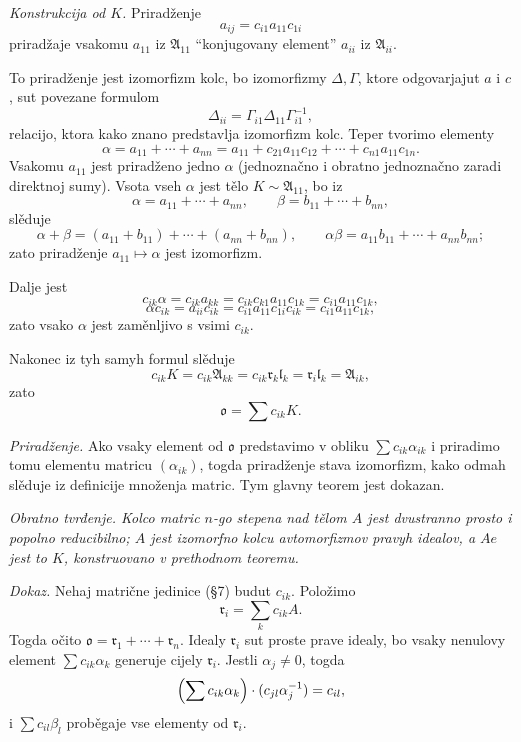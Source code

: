 \documentclass[11pt]{article}
\providecommand{\mA}{\mathfrak{A}}
\providecommand{\ml}{\mathfrak{l}}
\providecommand{\mo}{\mathfrak{o}}
\providecommand{\mr}{\mathfrak{r}}
\begin{document}

\emph{Konstrukcija od $K$.} Priradženje
\[
        a_{ij}=c_{i1}a_{11}c_{1i}
\]
priradžaje vsakomu $a_{11}$ iz $\mA_{11}$ ``konjugovany element'' $a_{ii}$ iz $\mA_{ii}$.

To priradženje jest izomorfizm kolc, bo izomorfizmy $\Delta,\Gamma$, ktore odgovarjajut $a$ i $c$, sut povezane formulom
\[
        \Delta_{ii}=\Gamma_{i1}\Delta_{11}\Gamma_{i1}^{-1},
\]
relacijo, ktora kako znano predstavlja izomorfizm kolc. Teper tvorimo elementy
\[
        \alpha=a_{11}+\cdots+a_{nn}=a_{11}+c_{21}a_{11}c_{12}+\cdots+c_{n1}a_{11}c_{1n}.
\]
Vsakomu $a_{11}$ jest priradženo jedno $\alpha$ (jednoznačno i obratno jednoznačno zaradi direktnoj sumy). Vsota vseh $\alpha$ jest tělo $K\sim\mA_{11}$, bo iz
\[
        \alpha=a_{11}+\cdots+a_{nn},
        \qquad
        \beta=b_{11}+\cdots+b_{nn},
\]
slěduje
\[
        \alpha+\beta=(a_{11}+b_{11})+\cdots+(a_{nn}+b_{nn}),
        \qquad
        \alpha\beta=a_{11}b_{11}+\cdots+a_{nn}b_{nn};
\]
zato priradženje $a_{11}\mapsto\alpha$ jest izomorfizm.

Dalje jest
\[
        c_{ik}\alpha=c_{ik}a_{kk}=c_{ik}c_{k1}a_{11}c_{1k}=c_{i1}a_{11}c_{1k},
\]
\[
        \alpha c_{ik}=a_{ii}c_{ik}=c_{i1}a_{11}c_{1i}c_{ik}=c_{i1}a_{11}c_{1k},
\]
zato vsako $\alpha$ jest zaměnljivo s vsimi $c_{ik}$.

Nakonec iz tyh samyh formul slěduje
\[
        c_{ik}K=c_{ik}\mA_{kk}=c_{ik}\mr_k\ml_k=\mr_i\ml_k=\mA_{ik},
\]
zato
\[
        \mo=\sum c_{ik}K.
\]

\emph{Priradženje.} Ako vsaky element od $\mo$ predstavimo v obliku $\sum c_{ik}\alpha_{ik}$ i priradimo tomu elementu matricu $(\alpha_{ik})$, togda priradženje stava izomorfizm, kako odmah slěduje iz definicije množenja matric. Tym glavny teorem jest dokazan.

\emph{Obratno tvrđenje. Kolco matric $n$-go stepena nad tělom $A$ jest dvustranno prosto i popolno reducibilno; $A$ jest izomorfno kolcu avtomorfizmov pravyh idealov, a $Ae$ jest to $K$, konstruovano v prethodnom teoremu.}

\emph{Dokaz.} Nehaj matrične jedinice (§7) budut $c_{ik}$. Položimo
\[
        \mr_i=\sum_k c_{ik}A.
\]
Togda očito $\mo=\mr_1+\cdots+\mr_n$. Idealy $\mr_i$ sut proste prave idealy, bo vsaky nenulovy element $\sum c_{ik}\alpha_k$ generuje cijely $\mr_i$. Jestli $\alpha_j\ne0$, togda
\[
        \Bigl(\sum c_{ik}\alpha_k\Bigr)\cdot(c_{jl}\alpha_j^{-1})=c_{il},
\]
i $\sum c_{il}\beta_l$ proběgaje vse elementy od $\mr_i$.
\end{document}
